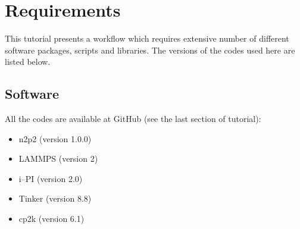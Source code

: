 \documentclass[12pt]{article}
\begin{document}
%


%

\newpage
%

\section{Requirements}
This tutorial presents a workflow which requires extensive number of different software packages, scripts and libraries. The versions of the codes used here are listed below.

\subsection{Software}
All the codes are available at GitHub (see the last section of tutorial):
\begin{itemize}
    \item n2p2 (version 1.0.0)
    \item LAMMPS (version 2)
    \item i--PI (version 2.0)
    \item Tinker (version 8.8)
    \item cp2k (version 6.1)
\end{itemize}
%
\end{document}
